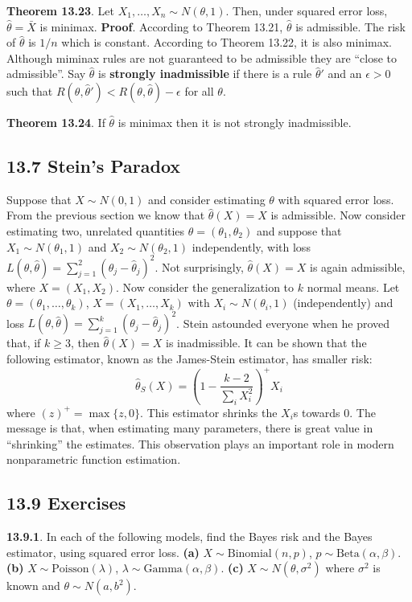 \textbf{Theorem 13.23}. Let \(X_{1}, \dots, X_{n} \sim N(\theta, 1)\). Then,
under squared error loss, \(\hat{\theta} = \bar{X}\) is minimax.
\textbf{Proof}. According to Theorem 13.21, \(\hat{\theta}\) is
admissible. The risk of \(\hat{\theta}\) is \(1/n\) which is constant.
According to Theorem 13.22, it is also minimax.
Although miminax rules are not guaranteed to be admissible they are
``close to admissible''. Say \(\hat{\theta}\) is \textbf{strongly
inadmissible} if there is a rule \(\hat{\theta}'\) and an
\(\epsilon > 0\) such that
\(R(\theta, \hat{\theta}') < R(\theta, \hat{\theta}) - \epsilon\) for
all \(\theta\).

\textbf{Theorem 13.24}. If \(\hat{\theta}\) is minimax then it is not
strongly inadmissible.

\subsection*{13.7 Stein's Paradox}\label{steins-paradox}
Suppose that \(X \sim N(0, 1)\) and consider estimating \(\theta\) with
squared error loss. From the previous section we know that
\(\hat{\theta}(X) = X\) is admissible.
Now consider estimating two, unrelated quantities
\(\theta = (\theta_{1}, \theta_{2})\) and suppose that
\(X_{1} \sim N(\theta_{1}, 1)\) and \(X_{2} \sim N(\theta_{2}, 1)\)
independently, with loss
\(L(\theta, \hat{\theta}) = \sum_{j=1}^{2} (\theta_{j} - \hat{\theta}_{j})^{2}\).
Not surprisingly, \(\hat{\theta}(X) = X\) is again admissible, where
\(X = (X_{1}, X_{2})\).
Now consider the generalization to \(k\) normal means. Let
\(\theta = (\theta_{1}, \dots, \theta_{k})\), \(X = (X_{1}, \dots, X_{k})\) with
\(X_{i} \sim N(\theta_{i}, 1)\) (independently) and loss
\(L(\theta, \hat{\theta}) = \sum_{j=1}^{k} (\theta_{j} - \hat{\theta}_{j})^{2}\).
Stein astounded everyone when he proved that, if \(k \geq 3\), then
\(\hat{\theta}(X) = X\) is inadmissible. It can be shown that the
following estimator, known as the James-Stein estimator, has smaller
risk:
\[
\hat{\theta}_S(X) = \left(1 - \frac{k-2}{\sum_{i} X_{i}^{2}} \right)^+ X_{i}
\]
where \((z)^+ = \max \{z, 0\}\). This estimator shrinks the \(X_{i}\)s
towards 0. The message is that, when estimating many parameters, there
is great value in ``shrinking'' the estimates. This observation plays an
important role in modern nonparametric function estimation.

\subsection*{13.9 Exercises}
\textbf{13.9.1}. In each of the following models, find the Bayes risk
and the Bayes estimator, using squared error loss.
\textbf{(a)} \(X \sim \text{Binomial}(n, p)\),
\(p \sim \text{Beta}(\alpha, \beta)\).
\textbf{(b)} \(X \sim \text{Poisson}(\lambda)\),
\(\lambda \sim \text{Gamma}(\alpha, \beta)\).
\textbf{(c)} \(X \sim N(\theta, \sigma^{2})\) where \(\sigma^{2}\) is known
and \(\theta \sim N(a, b^{2})\).

